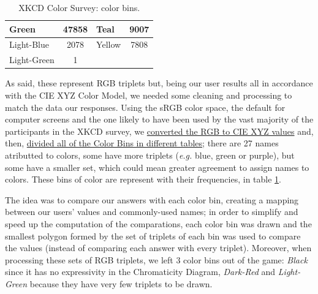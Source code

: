 \begin{table}[!htbp]
\begin{center}
{\begin{tabular}{@{}lclc@{}}
      \multicolumn{1}{l|}{Green}       & \multicolumn{1}{c||}{47858} & \multicolumn{1}{l|}{Teal}       & 9007      \\ \midrule
      \multicolumn{1}{l|}{Light-Blue}  & \multicolumn{1}{c||}{2078}  & \multicolumn{1}{l|}{Yellow}     & 7808      \\ \midrule
      \multicolumn{1}{l|}{Light-Green} & \multicolumn{1}{c|}{1}     & \multicolumn{2}{l}{}                        \\ \cmidrule(r){1-2}
    \end{tabular}}
  \end{center}
  \caption[XKCD Color Survey: Color Bins]{XKCD Color Survey: color bins.}
  \label{table:colorbins}
\end{table} \par
%
As said, these represent \gls{RGB} triplets but, being our user results all in accordance with the CIE XYZ Color Model, we needed some cleaning and processing to match the data our
responses. Using the sRGB color space, the default for computer screens and the one likely to have been used by the vast majority of the participants in the XKCD survey, we
\ul{converted the RGB to CIE XYZ values} and, then, \ul{divided all of the Color Bins in different tables}; there are 27 names atributted to colors, some have more triplets
(\emph{e.g.} blue, green or purple), but some have a smaller set, which could mean greater agreement to assign names to colors. These bins of color are represent with their frequencies, in table
\ref{table:colorbins}. \par
%
The idea was to compare our answers with each color bin, creating a mapping between our users' values and commonly-used names; in order to simplify and speed up the computation
of the comparations, each color bin was drawn and the smallest polygon formed by the set of triplets of each bin was used to compare the values (instead of comparing each answer
with every triplet). Moreover, when processing these sets of RGB triplets, we left 3 color bins out of the game: \emph{Black} since it has no expressivity in the Chromaticity Diagram,
\emph{Dark-Red} and \emph{Light-Green} because they have very few triplets to be drawn.
%
